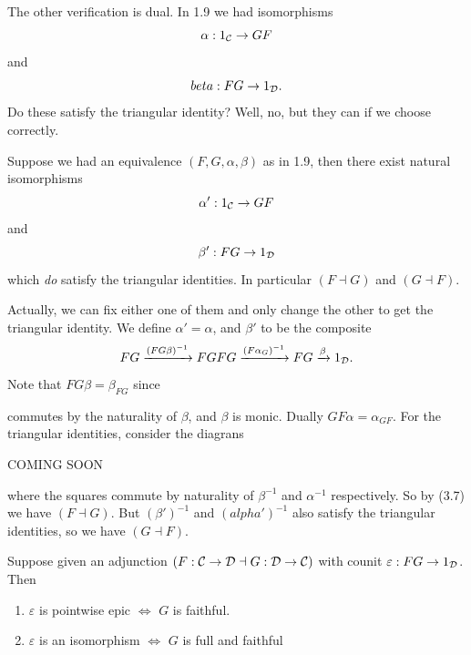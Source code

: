 \documentclass{article}
\begin{document}
The other verification is dual. \endproof
In 1.9 we had isomorphisms \[ \alpha : 1_{\mathcal{C}} \to GF\] and \[ beta : FG \to 1_{\mathcal{D}}.\] Do these satisfy the triangular identity? Well, no, but they can if we choose correctly.
\begin{fancyprop}{}
    Suppose we had an equivalence $(F,G,\alpha, \beta)$ as in 1.9, then there exist natural isomorphisms \[ \alpha' : 1_{\mathcal{C}} \to GF\] and \[ \beta' : FG \to 1_{\mathcal{D}} \] which \textit{do} satisfy the triangular identities. In particular $(F \dashv G)$ and $(G \dashv F)$.
\end{fancyprop}
\proof Actually, we can fix either one of them and only change the other to get the triangular identity. We define $\alpha' = \alpha$, and $\beta'$ to be the composite \[ FG \xrightarrow{(FG \beta)^{-1}} FGFG \xrightarrow{(F \alpha_{G})^{-1}} FG \xrightarrow{\beta} 1_{\mathcal{D}}.\] Note that $FG \beta = \beta_{FG}$ since \begin{center}
\end{center}
commutes by the naturality of $\beta$, and $\beta$ is monic. Dually $GF\alpha = \alpha_{GF}$. For the triangular identities, consider the diagrans
\begin{center}
 \Large COMING SOON \normalsize
\end{center}
where the squares commute by naturality of $\beta^{-1}$ and $\alpha^{-1}$ respectively. So by (3.7) we have $(F \dashv G)$. But $(\beta')^{-1}$ and $(alpha')^{-1}$ also satisfy the triangular identities, so we have $(G \dashv F)$. \endproof
\begin{fancylem}{}
    Suppose given an adjunction $(F : \mathcal{C} \to \mathcal{D} \dashv G : \mathcal{D} \to \mathcal{C})$ with counit $\varepsilon: FG \to 1_{\mathcal{D}}$. Then \begin{enumerate}
        \item[(i)] $\varepsilon$ is pointwise epic $\Leftrightarrow$ $G$ is faithful.
        \item[(ii)] $\varepsilon$ is an isomorphism $\Leftrightarrow$ $G$ is full and faithful  
    \end{enumerate}
\end{fancylem}
\end{document}

